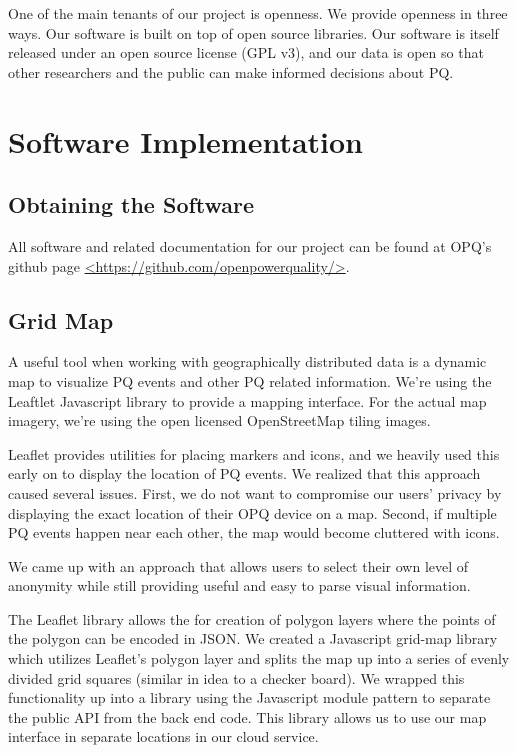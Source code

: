 \documentclass[11pt]{article}
\begin{document}
One of the main tenants of our project is openness. We provide openness in three ways. Our software is built on top of open source libraries. Our software is itself released under an open source license (GPL v3), and our data is open so that other researchers and the public can make informed decisions about PQ.

\section{Software Implementation}
\subsection{Obtaining the Software}
All software and related documentation for our project can be found at OPQ's github page \url{<https://github.com/openpowerquality/>}.

\subsection{Grid Map}
A useful tool when working with geographically distributed data is a dynamic map to visualize PQ events and other PQ related information. We're using the Leaftlet Javascript library to provide a mapping interface. For the actual map imagery, we're using the open licensed OpenStreetMap tiling images.

Leaflet provides utilities for placing markers and icons, and we heavily used this early on to display the location of PQ events. We realized that this approach caused several issues. First, we do not want to compromise our users' privacy by displaying the exact location of their OPQ device on a map. Second, if multiple PQ events happen near each other, the map would become cluttered with icons.

We came up with an approach that allows users to select their own level of anonymity while still providing useful and easy to parse visual information.

The Leaflet library allows the for creation of polygon layers where the points of the polygon can be encoded in JSON. We created a Javascript grid-map library which utilizes Leaflet's polygon layer and splits the map up into a series of evenly divided grid squares (similar in idea to a checker board). We wrapped this functionality up into a library using the Javascript module pattern to separate the public API from the back end code. This library allows us to use our map interface in separate locations in our cloud service.
\end{document}
